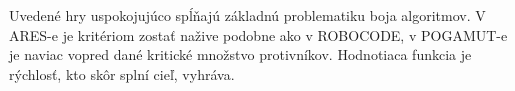 Uvedené hry uspokojujúco spĺňajú základnú problematiku boja algoritmov. V ARES-e je kritériom zostať nažive podobne ako v ROBOCODE, v POGAMUT-e je naviac vopred dané kritické množstvo protivníkov. Hodnotiaca funkcia je rýchlosť, kto skôr splní cieľ, vyhráva.\\

